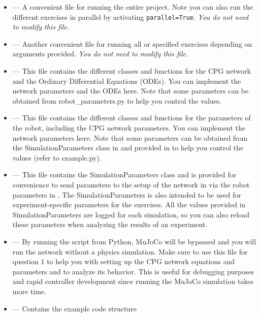 \documentclass{cmc}
\begin{document}
\begin{itemize}
\item {} --- A convenient file for running the entire
  project. Note you can also run the different exercises in parallel by
  activating \texttt{parallel=True}. \textit{You do not need to modify this
    file.}
\item {} --- Another convenient file for running all
  or specified exercises depending on arguments provided. \textit{You do not
    need to modify this file.}
\item {} --- This file contains the different classes and
  functions for the CPG network and the Ordinary Differential Equations
  (ODEs). You can implement the network parameters and the ODEs here. Note that
  some parameters can be obtained from robot\_parameters.py to help you control
  the values.
\item {} --- This file contains the different
  classes and functions for the parameters of the robot, including the CPG
  network parameters. You can implement the network parameters here. Note that
  some parameters can be obtained from the SimulationParameters class in
   and provided in  to
  help you control the values (refer to example.py).
\item {} --- This file contains the
  SimulationParameters class and is provided for convenience to send parameters
  to the setup of the network in  via the
  robot parameters in . The
  SimulationParameters is also intended to be used for experiment-specific
  parameters for the exercises. All the values provided in SimulationParameters
  are logged for each simulation, so you can also reload these parameters when
  analyzing the results of an experiment.
\item {} --- By running the script from Python,
  MuJoCo will be bypassed and you will run the network without a physics
  simulation. Make sure to use this file for question 1 to help you with
  setting up the CPG network equations and parameters and to analyze its
  behavior. This is useful for debugging purposes and rapid controller
  development since running the MuJoCo simulation takes more time.
\item {} --- Contains the example code structure

\end{itemize}
\end{document}

